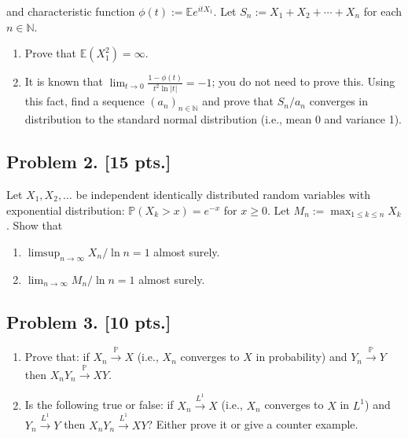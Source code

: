 \documentclass[11pt,a4paper]{article}
\begin{document}
and characteristic function \( \phi(t) := \mathbb{E} e^{it X_1} \). Let \( S_n := X_1 + X_2 + \cdots + X_n \) for each \( n \in \mathbb{N} \).
\begin{enumerate}[label=(\alph*)]
    \item Prove that \( \mathbb{E}(X_1^2) = \infty \).
    \item It is known that \( \lim_{t \to 0} \frac{1-\phi(t)}{t^2 \ln |t|} = -1 \); you do not need to prove this. Using this fact, find a sequence \( (a_n)_{n \in \mathbb{N}} \) and prove that \( S_n / a_n \) converges in distribution to the standard normal distribution (i.e., mean 0 and variance 1).
\end{enumerate}

\subsection{Problem 2. [15 pts.]}
Let \( X_1, X_2, \dots \) be independent identically distributed random variables with exponential distribution: \( \mathbb{P}(X_k > x) = e^{-x} \) for \( x \ge 0 \). Let \( M_n := \max_{1 \le k \le n} X_k \). Show that
\begin{enumerate}[label=(\alph*)]
    \item \( \limsup_{n \to \infty} X_n / \ln n = 1 \) almost surely.
    \item \( \lim_{n \to \infty} M_n / \ln n = 1 \) almost surely.
\end{enumerate}

\subsection{Problem 3. [10 pts.]}
\begin{enumerate}[label=(\alph*)]
    \item Prove that: if \( X_n \xrightarrow{\mathbb{P}} X \) (i.e., \( X_n \) converges to \( X \) in probability) and \( Y_n \xrightarrow{\mathbb{P}} Y \) then \( X_n Y_n \xrightarrow{\mathbb{P}} XY \).
    \item Is the following true or false: if \( X_n \xrightarrow{L^1} X \) (i.e., \( X_n \) converges to \( X \) in \( L^1 \)) and \( Y_n \xrightarrow{L^1} Y \) then \( X_n Y_n \xrightarrow{L^1} XY \)? Either prove it or give a counter example.
\end{enumerate}
\end{document}
